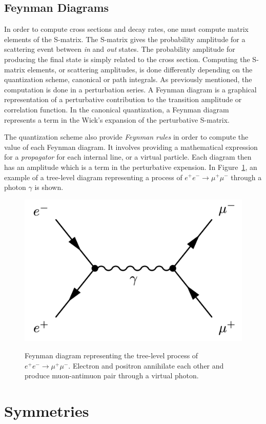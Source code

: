 \subsection{Feynman Diagrams}

In order to compute cross sections and decay rates, one must compute matrix elements of the S-matrix. The S-matrix gives the probability amplitude for a scattering event between \emph{in} and \emph{out} states. The probability amplitude for producing the final state is simply related to the cross section. Computing the S-matrix elements, or scattering amplitudes, is done differently depending on the quantization scheme, canonical or path integrals. As previously mentioned, the computation is done in a perturbation series. A Feynman diagram is a graphical representation of a perturbative contribution to the transition amplitude or correlation function. In the canonical quantization, a Feynman diagram represents a term in the Wick's expansion of the perturbative S-matrix. 

The quantization scheme also provide \emph{Feynman rules} in order to compute the value of each Feynman diagram. It involves providing a mathematical expression for a \emph{propagator} for each internal line, or a virtual particle. Each diagram then has an amplitude which is a term in the perturbative expension. In Figure~\ref{fig:e-to-mu-feynman}, an example of a tree-level diagram representing a process of $e^+ e^- \rightarrow \mu^+ \mu^-$ through a photon $\gamma$ is shown.

\begin{figure}[!htb]
\centering
\includegraphics[width=0.5\linewidth]{plots/feynman_diagrams/feynman_e_to_mu.png}  \\
\caption[Electrons to Muons Feynman diagram]{Feynman diagram representing the tree-level process of $e^+ e^- \rightarrow \mu^+ \mu^-$. Electron and positron annihilate each other and produce muon-antimuon pair through a virtual photon.}
\label{fig:e-to-mu-feynman}
\end{figure}

\clearpage
\section{Symmetries}

